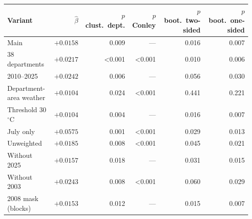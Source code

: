 \begin{tabular}{lrrrrr}
\toprule
Variant & $\hat\beta$ & $p$ clust.\ dept. & $p$ Conley & $p$ boot.\ two-sided & $p$ boot.\ one-sided \\
\midrule
Main & $+0.0158$ & 0.009 & --- & 0.016 & 0.007 \\
38 departments & $+0.0217$ & <0.001 & <0.001 & 0.010 & 0.006 \\
2010--2025 & $+0.0242$ & 0.006 & --- & 0.056 & 0.030 \\
Department-area weather & $+0.0104$ & 0.024 & <0.001 & 0.441 & 0.221 \\
Threshold 30\,$^{\circ}$C & $+0.0104$ & 0.004 & --- & 0.016 & 0.007 \\
July only & $+0.0575$ & 0.001 & <0.001 & 0.029 & 0.013 \\
Unweighted & $+0.0185$ & 0.008 & <0.001 & 0.045 & 0.021 \\
Without 2025 & $+0.0157$ & 0.018 & --- & 0.031 & 0.015 \\
Without 2003 & $+0.0243$ & 0.008 & <0.001 & 0.060 & 0.029 \\
2008 mask (blocks) & $+0.0153$ & 0.012 & --- & 0.015 & 0.007 \\
\bottomrule
\end{tabular}
